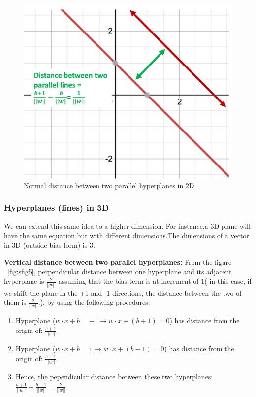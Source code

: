 \documentclass[11pt]{article}
\begin{document}
\begin{itemize}
{\begin{figure}[H]
  \centering
  \includegraphics[width=.4\linewidth]{images/distance_2_lines.png}
  \caption{Normal distance between two parallel hyperplanes in 2D}
  \label{fig:sfig4}
\end{figure}

}
\end{itemize}

\subsubsection{Hyperplanes (lines) in 3D}
We can extend this same idea to a higher dimension. For instance,a 3D plane will have the same equation but with different dimensions.The dimensions of a vector in 3D (outside bias form) is 3.

\textbf{Vertical distance between two parallel hyperplanes:} From the figure ~\ref{fig:sfig5}, perpendicular distance between one hyperplane and its adjacent hyperplane is $\frac{2}{||w||}$ assuming that the bias term is at increment of 1( in this case, if we shift the plane in the +1 and -1 directions, the distance between the two of them is $\frac{2}{||w||}$.), by using the following procedures:
\begin{enumerate}
    \item Hyperplane ($w \cdot x + b = -1 \rightarrow w \cdot x + (b+1) = 0$) has distance from the origin of: $\frac{b+1}{||w||}$
     \item Hyperplane ($w \cdot x + b = 1 \rightarrow w \cdot x + (b-1) = 0$) has distance from the origin of: $\frac{b-1}{||w||}$
    \item Hence, the pependicular distance between these two hyperplanes: $\frac{b+1}{||w||} - \frac{b-1}{||w||} = \frac{2}{||w||}$
\end{enumerate}

\end{document}
